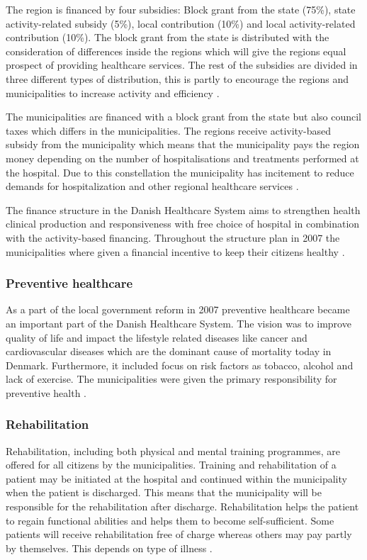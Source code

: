 The region is financed by four subsidies: Block grant from the state (75\%), state activity-related subsidy (5\%), local contribution (10\%) and local activity-related contribution (10\%). The block grant from the state is distributed with the consideration of differences inside the regions which will give the regions equal prospect of providing healthcare services. The rest of the subsidies are divided in three different types of distribution, this is partly to encourage the regions and municipalities to increase activity and efficiency \cite{sundhedsministeriet}.

The municipalities are financed with a block grant from the state but also council taxes which differs in the municipalities. The regions receive activity-based subsidy from the municipality which means that the municipality pays the region money depending on the number of hospitalisations and treatments performed at the hospital. Due to this constellation the municipality has incitement to reduce demands for hospitalization and other regional healthcare services \cite{Healthcareindk2}.

The finance structure in the Danish Healthcare System aims to strengthen health clinical production and responsiveness with free choice of hospital in combination with the activity-based financing. Throughout the structure plan in 2007 the municipalities where given a financial incentive to keep their citizens healthy \cite{DKhealthreview}.

\subsubsection{Preventive healthcare}

As a part of the local government reform in 2007 preventive healthcare became an important part of the Danish Healthcare System. The vision was to improve quality of life and impact the lifestyle related diseases like cancer and cardiovascular diseases which are the dominant cause of mortality today in Denmark. Furthermore, it included focus on risk factors as tobacco, alcohol and lack of exercise. The municipalities were given the primary responsibility for preventive health \cite{sundhedsministeriet}.

\subsubsection{Rehabilitation}

Rehabilitation, including both physical and mental training programmes, are offered for all citizens by the municipalities. Training and rehabilitation of a patient may be initiated at the hospital and continued within the municipality when the patient is discharged. This means that the municipality will be responsible for the rehabilitation after discharge. Rehabilitation helps the patient to regain functional abilities and helps them to become self-sufficient. Some patients will receive rehabilitation free of charge whereas others may pay partly by themselves. This depends on type of illness \cite{Healthcareindk2, retningsrehab, WHO}.


